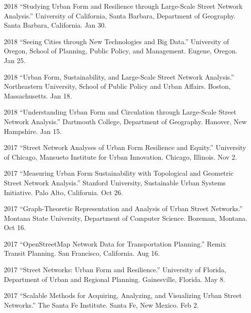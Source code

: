 \documentclass[11pt,letterpaper]{report}
\begin{document}
\begin{tablist}
        \item[2018] \tab{}\enquote{Studying Urban Form and Resilience through Large-Scale Street Network Analysis.} University of California, Santa Barbara, Department of Geography. Santa Barbara, California. Jan 30.

        \item[2018] \tab{}\enquote{Seeing Cities through New Technologies and Big Data.} University of Oregon, School of Planning, Public Policy, and Management. Eugene, Oregon. Jan 25.

        \item[2018] \tab{}\enquote{Urban Form, Sustainability, and Large-Scale Street Network Analysis.} Northeastern University, School of Public Policy and Urban Affairs. Boston, Massachusetts. Jan 18.

        \item[2018] \tab{}\enquote{Understanding Urban Form and Circulation through Large-Scale Street Network Analysis.} Dartmouth College, Department of Geography. Hanover, New Hampshire. Jan 15.

        \item[2017] \tab{}\enquote{Street Network Analyses of Urban Form Resilience and Equity.} University of Chicago, Mansueto Institute for Urban Innovation. Chicago, Illinois. Nov 2.

        \item[2017] \tab{}\enquote{Measuring Urban Form Sustainability with Topological and Geometric Street Network Analysis.} Stanford University, Sustainable Urban Systems Initiative. Palo Alto, California. Oct 26.

        \item[2017] \tab{}\enquote{Graph-Theoretic Representation and Analysis of Urban Street Networks.} Montana State University, Department of Computer Science. Bozeman, Montana. Oct 16.

        \item[2017] \tab{}\enquote{OpenStreetMap Network Data for Transportation Planning.} Remix Transit Planning. San Francisco, California. Aug 16.

        \item[2017] \tab{}\enquote{Street Networks: Urban Form and Resilience.} University of Florida, Department of Urban and Regional Planning. Gainesville, Florida. May 8.

        \item[2017] \tab{}\enquote{Scalable Methods for Acquiring, Analyzing, and Visualizing Urban Street Networks.} The Santa Fe Institute. Santa Fe, New Mexico. Feb 2.


\end{tablist}
\end{document}
